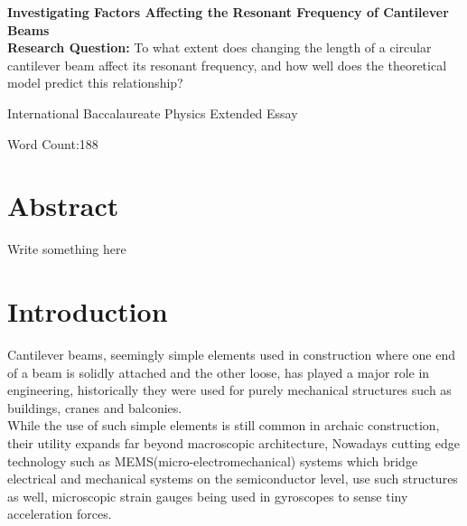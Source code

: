 \documentclass[a4paper,12pt]{article}
\begin{document}
\begin{titlepage}
    \begin{center}
        \vspace*{1cm}

        \textbf{Investigating Factors Affecting the Resonant Frequency of Cantilever Beams}\\

        \vspace{.5cm}
        \textbf{Research Question:}
        To what extent does changing the length of a circular cantilever beam affect its resonant frequency, and how well does the theoretical model predict this relationship?

        \vspace{0.5cm}
        International Baccalaureate Physics Extended Essay

        \vfill

        \vspace{0.8cm}

        Word Count:188


    \end{center}
\end{titlepage}

\tableofcontents
\pagebreak

\section{Abstract}%
Write something here

\section{Introduction}%

    Cantilever beams, seemingly simple elements used in construction where one end of a beam is solidly attached and the other loose, has played a major role in engineering, historically they were used for purely mechanical structures such as buildings, cranes and balconies.
    \autocite{BuildingConstructionBook}\\
    While the use of such simple elements is still common in archaic construction, their utility expands far beyond macroscopic architecture, Nowadays cutting edge technology such as MEMS(micro-electromechanical) systems which bridge electrical and mechanical systems on the semiconductor level, use such structures as well, microscopic strain gauges being used in gyroscopes to sense tiny acceleration forces.
    \autocite{MemsBook}%
\end{document}
